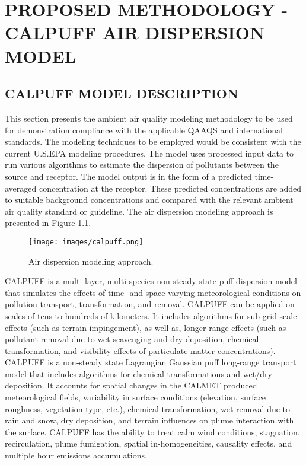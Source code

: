 \chapter{PROPOSED METHODOLOGY - CALPUFF AIR DISPERSION MODEL}

\section{CALPUFF MODEL DESCRIPTION}
This section presents the ambient air quality modeling methodology to be used for demonstration compliance with the applicable QAAQS and international standards. The modeling techniques to be employed would be consistent with the current U.S.EPA modeling procedures. The model uses processed input data to run various algorithms to estimate the dispersion of pollutants between the source and receptor. The model output is in the form of a predicted time-averaged concentration at the receptor. These predicted concentrations are added to suitable background concentrations and compared with the relevant ambient air quality standard or guideline. The air dispersion modeling approach is presented in Figure \ref{fig:calpuff}. 

\begin{figure}[H]
\centering
\texttt{[image: images/calpuff.png]} 
\caption{Air dispersion modeling approach.}
\label{fig:calpuff}
\end{figure}
%
CALPUFF is a multi-layer, multi-species non-steady-state puff dispersion model that simulates the effects of time- and space-varying meteorological conditions on pollution transport, transformation, and removal.  CALPUFF can be applied on scales of tens to hundreds of kilometers.  It includes algorithms for sub grid scale effects (such as terrain impingement), as well as, longer range effects (such as pollutant removal due to wet scavenging and dry deposition, chemical transformation, and visibility effects of particulate matter concentrations). CALPUFF is a non‐steady state Lagrangian Gaussian puff long‐range transport model that includes algorithms for chemical transformations and wet/dry deposition.  It accounts for spatial changes in the CALMET produced meteorological fields, variability in surface conditions (elevation, surface roughness, vegetation type, etc.), chemical transformation, wet removal due to rain and snow, dry deposition, and terrain influences on plume interaction with the surface. CALPUFF has the ability to treat calm wind conditions, stagnation, recirculation, plume fumigation, spatial in-homogeneities, causality effects, and multiple hour emissions accumulations. 

